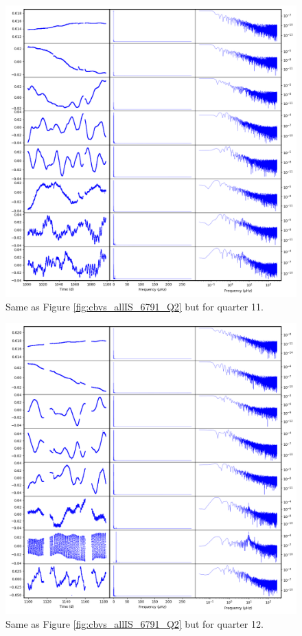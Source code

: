 \begin{figure}
    \centering
    \includegraphics[width=\linewidth]{Chapter_Appended/AppB/cbv_6791_q11.png}
    \caption{Same as Figure \ref{fig:cbvs_allIS_6791_Q2} but for quarter 11.}
    \label{fig:cbvs_allIS_6791_Q11}
\end{figure}


\begin{figure}
    \centering
    \includegraphics[width=\linewidth]{Chapter_Appended/AppB/cbv_6791_q12.png}
    \caption{Same as Figure \ref{fig:cbvs_allIS_6791_Q2} but for quarter 12.}
    \label{fig:cbvs_allIS_6791_Q12}
\end{figure}


